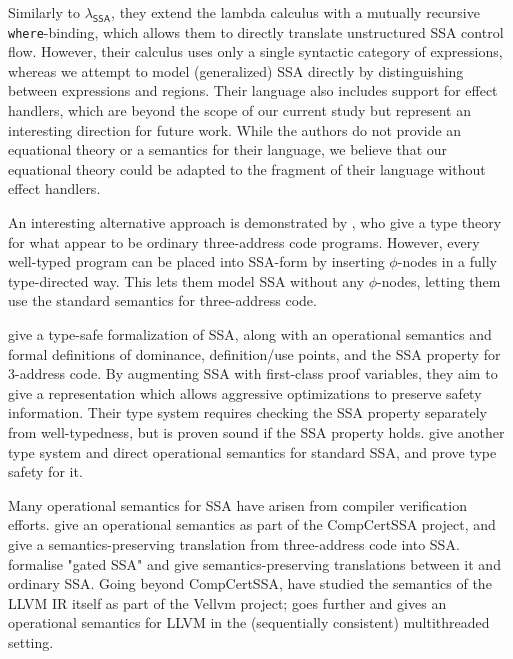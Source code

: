 \documentclass[acmsmall,screen,review]{acmart}
\newcommand{\ms}[1]{\ensuremath{\mathsf{#1}}}
\newcommand{\isotopessa}{\(\lambda_{\ms{SSA}}\)}
\begin{document}
Similarly to \isotopessa{}, they extend the lambda calculus with a mutually recursive
\texttt{where}-binding, which allows them to directly translate unstructured SSA control flow.
However, their calculus uses only a single syntactic category of expressions, whereas we attempt to
model (generalized) SSA directly by distinguishing between expressions and regions. Their language
also includes support for effect handlers, which are beyond the scope of our current study but
represent an interesting direction for future work. While the authors do not provide an equational
theory or a semantics for their language, we believe that our equational theory could be adapted to
the fragment of their language without effect handlers.

An interesting alternative approach is demonstrated by \citet{ssa-types-matsuno-ohori-06}, who give
a type theory for what appear to be ordinary three-address code programs. However, every well-typed
program can be placed into SSA-form by inserting $\phi$-nodes in a fully type-directed way. This
lets them model SSA without any $\phi$-nodes, letting them use the standard semantics for
three-address code. 

\citet{menon-verified-06} give a type-safe formalization of SSA, along with an operational semantics
and  formal definitions of dominance, definition/use points, and the SSA property for 3-address
code. By augmenting SSA with first-class proof variables, they aim to give a representation which
allows aggressive optimizations to preserve safety information. Their type system requires checking
the SSA property separately from well-typedness, but is proven sound if the SSA property holds.
\citet{hua-explicit-ssa-2010} give another type system and direct operational semantics for standard
SSA, and prove type safety for it.

Many operational semantics for SSA have arisen from compiler verification efforts.
\citet{barthe-compcert-ssa-2014} give an operational semantics as part of the CompCertSSA project,
and give a semantics-preserving translation from three-address code into SSA.
\citet{herklotz-gsa-2023} formalise "gated SSA" and give semantics-preserving translations between
it and ordinary SSA. Going beyond CompCertSSA, \citet{vellvm-12} have studied the semantics of the
LLVM IR itself as part of the Vellvm project; \citet{li-20-kllvm} goes further and gives an
operational semantics for LLVM in the (sequentially consistent) multithreaded setting.
\end{document}
